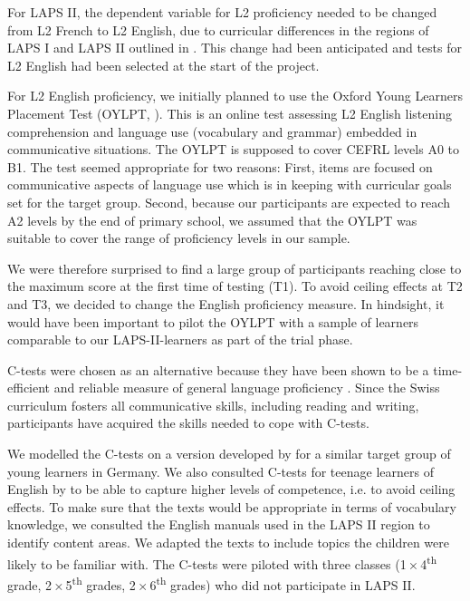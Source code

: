\documentclass[output=paper]{langsci/langscibook}
\begin{document}
For LAPS II, the dependent variable for L2 proficiency needed to be changed from L2 French to L2 English, due to curricular differences in the regions of LAPS I and LAPS II outlined in . This change had been anticipated and tests for L2 English had been selected at the start of the project.

For L2 English proficiency, we initially planned to use the Oxford Young Learners Placement Test (OYLPT, \citealt{Testing2013}). This is an online test assessing L2 English listening comprehension and language use (vocabulary and grammar) embedded in communicative situations. The OYLPT is supposed to cover CEFRL levels A0 to B1. The test seemed appropriate for two reasons: First, items are focused on communicative aspects of language use which is in keeping with curricular goals set for the target group. Second, because our participants are expected to reach A2 levels by the end of primary school, we assumed that the OYLPT was suitable to cover the range of proficiency levels in our sample. 

We were therefore surprised to find a large group of participants reaching close to the maximum score at the first time of testing (T1). To avoid ceiling effects at T2 and T3, we decided to change the English proficiency measure. In hindsight, it would have been important to pilot the OYLPT with a sample of learners comparable to our LAPS-II-learners as part of the trial phase. 

C-tests were chosen as an alternative because they have been shown to be a time-efficient and reliable measure of general language proficiency \citep{EckesGrotjahn2006}. Since the Swiss curriculum fosters all communicative skills, including reading and writing, participants have acquired the skills needed to cope with C-tests. 

We modelled the C-tests on a version developed by \citet{WildenPorsch2017} for a similar target group of young learners in Germany. We also consulted C-tests for teenage learners of English by \citet{BabaiiShahri2010} to be able to capture higher levels of competence, i.e. to avoid ceiling effects. To make sure that the texts would be appropriate in terms of vocabulary knowledge, we consulted the English manuals used in the LAPS II region to identify content areas. We adapted the texts to include topics the children were likely to be familiar with. The C-tests were piloted with three classes (1\,×\,4\textsuperscript{th} grade, 2\,×\,5\textsuperscript{th} grades, 2\,×\,6\textsuperscript{th} grades) who did not participate in LAPS II. 
\end{document}
